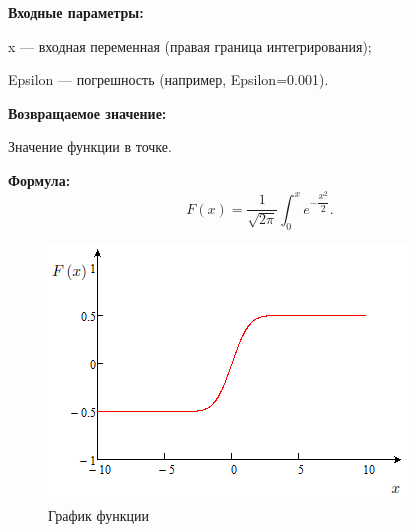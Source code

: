\textbf{Входные параметры:}

 x --- входная переменная (правая граница интегрирования);
 
 Epsilon --- погрешность (например, Epsilon=0.001).

\textbf{Возвращаемое значение:}

 Значение функции в точке.
 
\textbf{Формула:}
\begin{equation*}
F\left(x \right)=\dfrac{1}{\sqrt{2\pi}}\int_0^x {e^{-\dfrac{x^2}{2}}}.
\end{equation*}

 \begin{figure} [h] 
   \center
   \includegraphics {MHL_DistributionFunctionOfNormalDistribution_Graph.png}
   \caption{График функции} 
   \label{img:MHL_DistributionFunctionOfNormalDistribution_Graph}  
 \end{figure}
 
